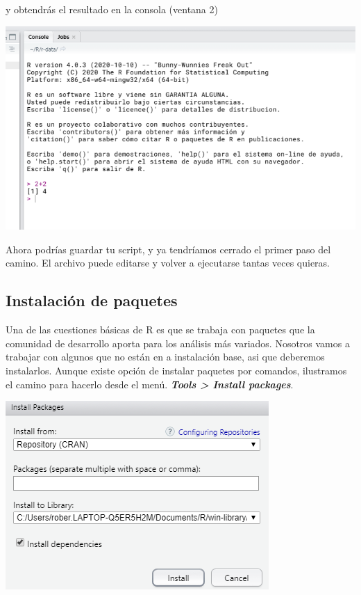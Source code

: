 \documentclass[
]{book}
\begin{document}
y obtendrás el resultado en la consola (ventana 2)

\includegraphics{data/RS06.png}

Ahora podrías guardar tu script, y ya tendríamos cerrado el primer paso del camino. El archivo puede editarse y volver a ejecutarse tantas veces quieras.

\hypertarget{instalaciuxf3n-de-paquetes}{%
\subsection{Instalación de paquetes}\label{instalaciuxf3n-de-paquetes}}

Una de las cuestiones básicas de R es que se trabaja con paquetes que la comunidad de desarrollo aporta para los análisis más variados. Nosotros vamos a trabajar con algunos que no están en a instalación base, asi que deberemos instalarlos. Aunque existe opción de instalar paquetes por comandos, ilustramos el camino para hacerlo desde el menú. \textbf{\emph{Tools \textgreater{} Install packages}}.

\includegraphics{data/install_packages.png}
\end{document}
